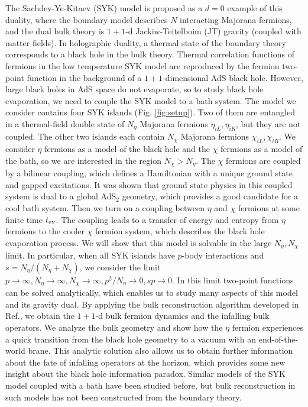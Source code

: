 \documentclass[pdflatex,sn-nature]{sn-jnl}
\begin{document}
The Sachdev-Ye-Kitaev (SYK) model\cite{sachdev1993gapless,kitaev2015simple,maldacena2016remarks} is proposed as a $d=0$ example of this duality, where the boundary model describes $N$ interacting Majorana fermions, and the dual bulk theory is $1+1$-d Jackiw-Teitelboim (JT) gravity\cite{jackiw1985lower,teitelboim1983gravitation} (coupled with matter fields). In holographic duality, a thermal state of the boundary theory corresponds to a black hole in the bulk theory. Thermal correlation functions of fermions in the low temperature SYK model are reproduced by the fermion two-point function in the background of a $1+1$-dimensional AdS black hole. However, large black holes in AdS space do not evaporate, so to study black hole evaporation, we need to couple the SYK model to a bath system. The model we consider contains four SYK islands (Fig. \ref{fig:setup}). Two of them are entangled in a thermal-field double state of $N_\eta$ Majorana fermions $\eta_{iL},\eta_{iR}$, but they are not coupled. The other two islands each contain $N_\chi$ Majorana fermions $\chi_{iL},\chi_{iR}$. We consider $\eta$ fermions as a model of the black hole and the $\chi$ fermions as a model of the bath, so we are interested in the region $N_\chi >N_\eta$. The $\chi$ fermions are coupled by a bilinear coupling, which defines a Hamiltonian with a unique ground state and gapped excitations. It was shown that\cite{maldacena2018eternal} ground state physics in this coupled system is dual to a global AdS$_2$ geometry, which provides a good candidate for a cool bath system. Then we turn on a coupling between $\eta$ and $\chi$ fermions at some finite time $t_{\rm ev}$. The coupling leads to a transfer of energy and entropy from $\eta$ fermions to the cooler $\chi$ fermion system, which describes the black hole evaporation process. We will show that this model is solvable in the large $N_\eta,N_\chi$ limit. In particular, when all SYK islands have $p$-body interactions and \(s=N_\eta/(N_\eta+N_\chi)\), we consider the limit $p\rightarrow \infty, N_\eta\rightarrow \infty, N_\chi\rightarrow \infty, p^2/N_\eta\rightarrow 0, sp\rightarrow 0$. In this limit two-point functions can be solved analytically, which enables us to study many aspects of this model and its gravity dual. By applying the bulk reconstruction algorithm developed in Ref.\cite{nebabu2024bulk}, we obtain the $1+1$-d bulk fermion dynamics and the infalling bulk operators. We analyze the bulk geometry and show how the $\eta$ fermion experiences a quick transition from the black hole geometry to a vacuum with an end-of-the-world brane. This analytic solution also allows us to obtain further information about the fate of infalling operators at the horizon, which provides some new insight about the black hole information paradox. Similar models of the SYK model coupled with a bath have been studied before\cite{zhang2019evaporation,chen2020replica,gaikwad2023microscopic,bragagnolo2026probing}, but bulk reconstruction in such models has not been constructed from the boundary theory.
\end{document}
